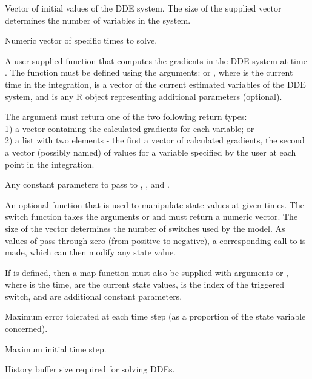 \documentclass[letterpaper]{book}
\begin{document}
\begin{Arguments}
\begin{ldescription}
\item[\code{y}] Vector of initial values of the DDE system. The size of the
supplied vector determines the number of variables in the system.
\item[\code{times}] Numeric vector of specific times to solve. 
\item[\code{func}] A user supplied function that computes the gradients in
the DDE system at time . The function must be defined
using the arguments:  or , where
 is the current time in the integration,  is a
vector of the current estimated variables of the DDE system, and
 is any R object representing additional parameters
(optional).

The argument  must return one of the two following
return types: \\{}
1) a vector containing the calculated gradients for each variable;
or \\{}
2) a list with two elements - the first a vector of calculated
gradients, the second a vector (possibly named) of values for a
variable specified by the user at each point in the integration.
\item[\code{parms}] Any constant parameters to pass to ,
, and .
\item[\code{switchfunc}] An optional function that is used to manipulate
state values at given times. The switch function takes the
arguments  or  and must return a
numeric vector. The size of the vector determines the number of
switches used by the model. As values of  pass
through zero (from positive to negative), a corresponding call to
 is made, which can then modify any state value.
\item[\code{mapfunc}] If  is defined, then a map function
must also be supplied with arguments  or
, where  is the time,
 are the current state values,  is the
index of the triggered switch, and  are additional
constant parameters.
\item[\code{tol}] Maximum error tolerated at each time step (as a
proportion of the state variable concerned).
\item[\code{dt}] Maximum initial time step.
\item[\code{hbsize}] History buffer size required for solving DDEs.
\end{ldescription}
\end{Arguments}
\end{document}
